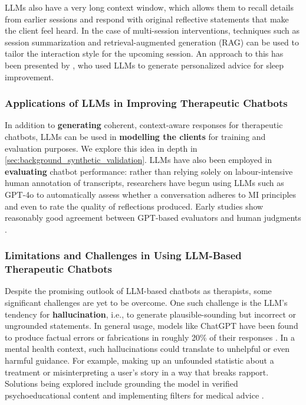 LLMs also have a very long context window, which allows them to recall details from earlier sessions and respond with original reflective statements that make the client feel heard. In the case of multi-session interventions, techniques such as session summarization and retrieval-augmented generation (RAG) can be used to tailor the interaction style for the upcoming session. An approach to this has been presented by \citet{corda2024context}, who used LLMs to generate personalized advice for sleep improvement.


\subsubsection{Applications of LLMs in Improving Therapeutic Chatbots}
In addition to \textbf{generating} coherent, context-aware responses for therapeutic chatbots, LLMs can be used in \textbf{modelling the clients} for training and evaluation purposes. We explore this idea in depth in \cref{sec:background_synthetic_validation}. LLMs have also been employed in \textbf{evaluating} chatbot performance: rather than relying solely on labour-intensive human annotation of transcripts, researchers have begun using LLMs such as GPT-4o to automatically assess whether a conversation adheres to MI principles and even to rate the quality of reflections produced. Early studies show reasonably good agreement between GPT-based evaluators and human judgments \cite{Scholich2025}.


\subsubsection{Limitations and Challenges in Using LLM-Based Therapeutic Chatbots}
Despite the promising outlook of LLM-based chatbots as therapists, some significant challenges are yet to be overcome. One such challenge is the LLM's tendency for \textbf{hallucination}, i.e., to generate plausible-sounding but incorrect or ungrounded statements. In general usage, models like ChatGPT have been found to produce factual errors or fabrications in roughly 20\% of their responses \cite{Li2023}. In a mental health context, such hallucinations could translate to unhelpful or even harmful guidance. For example, making up an unfounded statistic about a treatment or misinterpreting a user's story in a way that breaks rapport. Solutions being explored include grounding the model in verified psychoeducational content and implementing filters for medical advice \cite{Amugongo2025RAG}.


